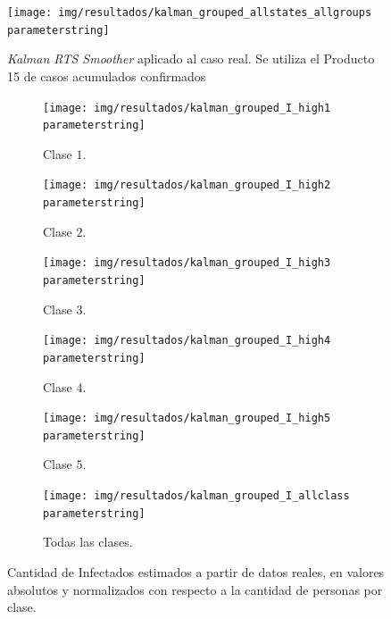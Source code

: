 \begin{figure}[H]
\centering
\texttt{[image: img/resultados/kalman\_grouped\_allstates\_allgroups\\parameterstring]}
\caption[\textit{Kalman RTS Smoother} aplicado al caso real ]{\textit{Kalman RTS Smoother} aplicado al caso real. Se utiliza el Producto 15 de casos acumulados confirmados}
\label{all-nohigh}
\end{figure}



\begin{figure}[H]
     \centering
     \begin{subfigure}[b]{0.47\textwidth}
         \centering
         \texttt{[image: img/resultados/kalman\_grouped\_I\_high1\\parameterstring]}
         \caption{Clase \(1\).}
     \end{subfigure}
     \hfill
     \begin{subfigure}[b]{.47\textwidth}
         \centering
         \texttt{[image: img/resultados/kalman\_grouped\_I\_high2\\parameterstring]}
         \caption{Clase \(2\).}
     \end{subfigure}
     \hfill
     \begin{subfigure}[b]{.47\textwidth}
         \centering
         \texttt{[image: img/resultados/kalman\_grouped\_I\_high3\\parameterstring]}
         \caption{Clase \(3\).}
     \end{subfigure}
     \hfill
     \begin{subfigure}[b]{.47\textwidth}
         \centering
         \texttt{[image: img/resultados/kalman\_grouped\_I\_high4\\parameterstring]}
         \caption{Clase \(4\).}
     \end{subfigure}
     \hfill
     \begin{subfigure}[b]{.47\textwidth}
         \centering
         \texttt{[image: img/resultados/kalman\_grouped\_I\_high5\\parameterstring]}
         \caption{Clase \(5\).}
     \end{subfigure}
     \hfill
     \begin{subfigure}[b]{.47\textwidth}
         \centering
         \texttt{[image: img/resultados/kalman\_grouped\_I\_allclass\\parameterstring]}
         \caption{Todas las clases.}
     \end{subfigure}
        \caption{Cantidad de Infectados estimados a partir de datos reales, en valores absolutos y normalizados con respecto a la cantidad de personas por clase.}
        \label{e-comp-high}
\end{figure}



